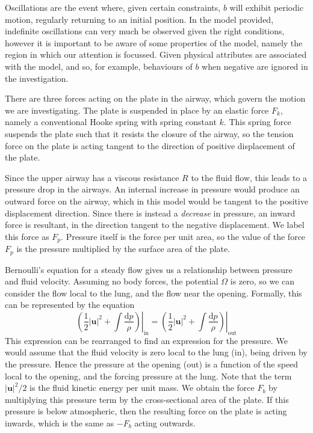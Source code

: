 \documentclass{report}
\begin{document}
Oscillations are the event where, given certain constraints, $b$ will exhibit periodic motion, regularly returning to an initial position. %
In the model provided, indefinite oscillations can very much be observed given the right conditions,
however it is important to be aware of some properties of the model,
namely the region in which our attention is focussed. Given physical attributes are associated with the model,
and so, for example, behaviours of $b$ when negative are ignored in the investigation.

There are three forces acting on the plate in the airway, which govern the motion we are investigating.
The plate is suspended in place by an elastic force $F_k$, namely a conventional Hooke spring with spring constant $k$.
This spring force suspends the plate such that it resists the closure of the airway,
so the tension force on the plate is acting tangent to the direction of positive displacement of the plate.


Since the upper airway has a viscous resistance $R$ to the fluid flow,
this leads to a pressure drop in the airways. %
An internal increase in pressure would produce an outward force on the airway,
which in this model would be tangent to the positive displacement direction.
Since there is instead a \textit{decrease} in pressure, an inward force is resultant,
in the direction tangent to the negative displacement. We label this force as $F_p$.
Pressure itself is the force per unit area,
so the value of the force $F_p$ is the pressure multiplied by the surface area of the plate.

Bernoulli's equation for a steady flow gives us a relationship between pressure and fluid velocity.
Assuming no body forces, the potential $\Omega$ is zero,
so we can consider the flow local to the lung, and the flow near the opening.
Formally, this can be represented by the equation
\begin{equation}
    \left.\left(\frac{1}{2}|\mathbf{u}|^2 + \int \frac{\mathrm{d}p}{\rho}\right)\right|_\mathrm{in} = \left.\left(\frac{1}{2}|\mathbf{u}|^2 + \int \frac{\mathrm{d}p}{\rho}\right)\right|_\mathrm{out}
\end{equation}
This expression can be rearranged to find an expression for the pressure.
We would assume that the fluid velocity is zero local to the lung (in),
being driven by the pressure.
Hence the pressure at the opening (out) is a function of the speed local to the opening,
and the forcing pressure at the lung.
Note that the term $|\mathbf{u}|^2/2$ is the fluid kinetic energy per unit mass.
We obtain the force $F_b$ by multiplying this pressure term by the cross-sectional area of the plate.
If this pressure is below atmospheric,
then the resulting force on the plate is acting inwards,
which is the same as $-F_b$ acting outwards.
\end{document}
